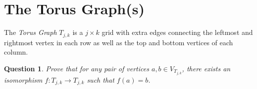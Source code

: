 \documentclass{article}
\newtheorem{question}{Question}
\begin{document}

\section{The Torus Graph(s)}
The \textit{Torus Graph} $T_{j,k}$ is a $j \times k$ grid with extra edges connecting the leftmost and rightmost vertex in each row as well as the top and bottom vertices of each column.

\begin{question}
    Prove that for any pair of vertices $a,b \in V_{T_{j,k}}$, there exists an isomorphism $f:T_{j,k} \to T_{j,k}$ such that $f(a) = b$.
\end{question}
\end{document}

